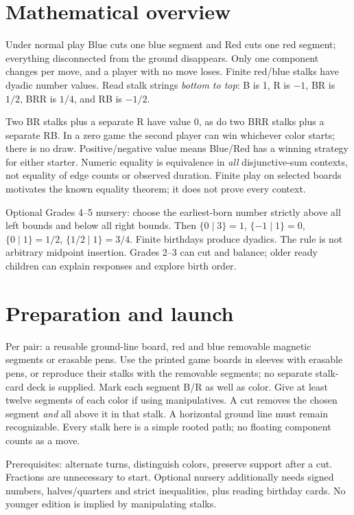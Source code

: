 \documentclass[11pt,letterpaper]{article}
\begin{document}
\section*{Mathematical overview}
Under normal play Blue cuts one blue segment and Red cuts one red segment; everything disconnected from the ground disappears. Only one component changes per move, and a player with no move loses. Finite red/blue stalks have dyadic number values. Read stalk strings \emph{bottom to top}: B is 1, R is $-1$, BR is $1/2$, BRR is $1/4$, and RB is $-1/2$.

Two BR stalks plus a separate R have value 0, as do two BRR stalks plus a separate RB. In a zero game the second player can win whichever color starts; there is no draw. Positive/negative value means Blue/Red has a winning strategy for either starter. Numeric equality is equivalence in \emph{all} disjunctive-sum contexts, not equality of edge counts or observed duration. Finite play on selected boards motivates the known equality theorem; it does not prove every context.

Optional Grades 4--5 nursery: choose the earliest-born number strictly above all left bounds and below all right bounds. Then $\{0\mid3\}=1$, $\{-1\mid1\}=0$, $\{0\mid1\}=1/2$, $\{1/2\mid1\}=3/4$. Finite birthdays produce dyadics. The rule is not arbitrary midpoint insertion. Grades 2--3 can cut and balance; older ready children can explain responses and explore birth order.
\newpage
\section*{Preparation and launch}
Per pair: a reusable ground-line board, red and blue removable magnetic segments or erasable pens. Use the printed game boards in sleeves with erasable pens, or reproduce their stalks with the removable segments; no separate stalk-card deck is supplied. Mark each segment B/R as well as color. Give at least twelve segments of each color if using manipulatives. A cut removes the chosen segment \emph{and} all above it in that stalk. A horizontal ground line must remain recognizable. Every stalk here is a simple rooted path; no floating component counts as a move.

Prerequisites: alternate turns, distinguish colors, preserve support after a cut. Fractions are unnecessary to start. Optional nursery additionally needs signed numbers, halves/quarters and strict inequalities, plus reading birthday cards. No younger edition is implied by manipulating stalks.
\end{document}
